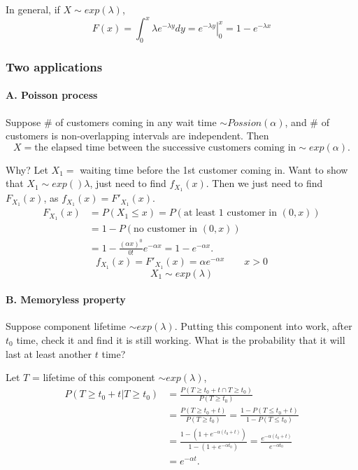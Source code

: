 In general, if $X\sim exp(\lambda)$,
\[F(x)=\int_0^{x} \lambda e^{-\lambda y} dy=\left. e^{-\lambda y}\right|_{0}^{x}=1-e^{-\lambda x}\]

\subsubsection{Two applications}
\paragraph{A. Poisson process}

Suppose \# of customers coming in any wait time $\sim Possion(\alpha)$, and \# of customers is non-overlapping intervals are independent. Then
\[X= \text{the elapsed time between the successive customers coming in}\sim exp(\alpha).\]

Why? Let $X_1=$ waiting time before the 1st customer coming in. Want to show that $X_1 \sim exp()\lambda$, just need to find $f_{X_1}(x)$. Then we just need to find $F_{X_1}(x)$, as $f_{X_1}(x)=F'_{X_1}(x)$.
\begin{align*}
F_{X_1}(x)&= P(X_1\leq x)=P(\text{at least 1 customer in }(0,x)) \\
&= 1-P(\text{no customer in }(0,x)) \\
&=1-\frac{(\alpha x)^0}{0!}e^{-\alpha x}=1-e^{-\alpha x}.
\end{align*}
\[f_{X_1}(x)=F'_{X_1}(x)=\alpha e^{-\alpha x} \qquad x>0\]
\[X_1 \sim exp(\lambda)\]


\paragraph{B. Memoryless property}
Suppose component lifetime $\sim exp(\lambda)$. Putting this component into work, after $t_0$ time, check it and find it is still working. What is the probability that it will last at least another $t$ time?

Let $T$ = lifetime of this component $\sim exp(\lambda)$,
\begin{align*}
P(T\geq t_0+t|T \geq t_0)&=\frac{P(T\geq t_0+t \cap T \geq t_0)}{P(T \geq t_0)} \\
&=\frac{P(T\geq t_0+t)}{P(T \geq t_0)}=\frac{1-P(T\leq t_0+t)}{1-P(T \leq t_0)} \\
&=\frac{1-(1+e^{-\alpha(t_0+t)})}{1-(1+e^{-\alpha t_0})}=\frac{e^{-\alpha(t_0+t)}}{e^{-\alpha t_0}} \\
&=e^{-\alpha t}.
\end{align*}

